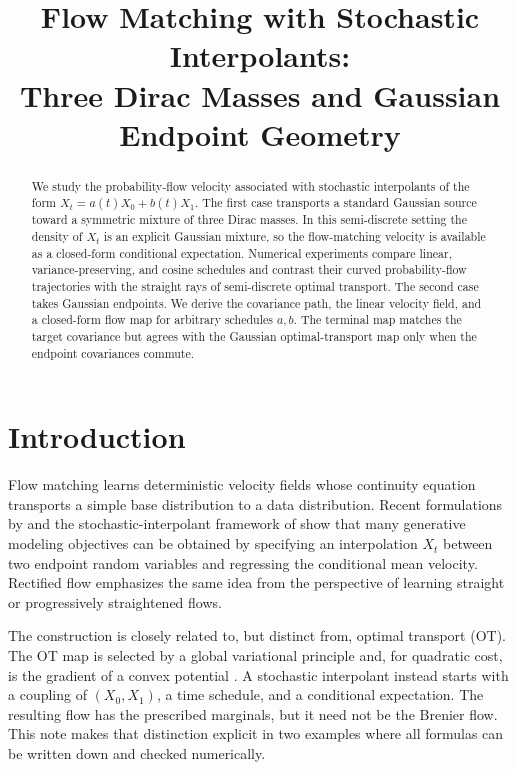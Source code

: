 \documentclass[11pt]{article}
\title{\vspace{-1em}Flow Matching with Stochastic Interpolants:\\
Three Dirac Masses and Gaussian Endpoint Geometry}
\author{}
\date{}
\begin{document}
\maketitle

\begin{abstract}
We study the probability-flow velocity associated with stochastic interpolants
of the form \(X_t=a(t)X_0+b(t)X_1\).  The first case transports a standard
Gaussian source toward a symmetric mixture of three Dirac masses.  In this
semi-discrete setting the density of \(X_t\) is an explicit Gaussian mixture,
so the flow-matching velocity is available as a closed-form conditional
expectation.  Numerical experiments compare linear, variance-preserving, and
cosine schedules and contrast their curved probability-flow trajectories with
the straight rays of semi-discrete optimal transport.  The second case takes
Gaussian endpoints.  We derive the covariance path, the linear velocity field,
and a closed-form flow map for arbitrary schedules \(a,b\).  The terminal map
matches the target covariance but agrees with the Gaussian optimal-transport
map only when the endpoint covariances commute.
\end{abstract}

\section{Introduction}

Flow matching learns deterministic velocity fields whose continuity equation
transports a simple base distribution to a data distribution.  Recent
formulations by \citet{lipman2023flow} and the stochastic-interpolant framework
of \citet{albergo2023stochastic} show that many generative modeling objectives
can be obtained by specifying an interpolation \(X_t\) between two endpoint
random variables and regressing the conditional mean velocity.  Rectified flow
\citep{liu2023flow} emphasizes the same idea from the perspective of learning
straight or progressively straightened flows.

The construction is closely related to, but distinct from, optimal transport
(OT).  The OT map is selected by a global variational principle and, for
quadratic cost, is the gradient of a convex potential \citep{mccann1997convexity,
villani2008optimal,santambrogio2015optimal}.  A stochastic interpolant instead
starts with a coupling of \((X_0,X_1)\), a time schedule, and a conditional
expectation.  The resulting flow has the prescribed marginals, but it need not
be the Brenier flow.  This note makes that distinction explicit in two examples
where all formulas can be written down and checked numerically.
\end{document}
